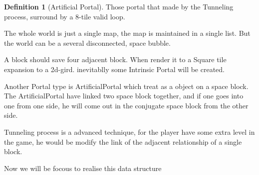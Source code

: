 \documentclass{article}
\theoremstyle{definition} %
\newtheorem{definition}{Definition}[section]
\begin{document}
\begin{definition}[Artificial Portal]
    \label{def:ArtificialPortal}
    Those portal that made by the Tunneling
    process, surround by a 8-tile valid loop.
\end{definition}

The whole world is just a single map,
the map is maintained in a single list.
But the world can be a several disconnected,
space bubble.

A block should save four adjacent block.
When render it to a Square tile expansion to
a 2d-gird. inevitablly some Intrinsic Portal
will be created.

Another Portal type is ArtificialPortal which
treat as a object on a space block.
The ArtificialPortal have linked two space block
together, and if one goes into one from
one side, he will come out in the conjugate
space block from the other side.

Tunneling process is a advanced technique,
for the player have some extra level in the
game, he would be modify the link of the adjacent
relationship of a single block.

Now we will be focous to realise this data
structure
\end{document}
